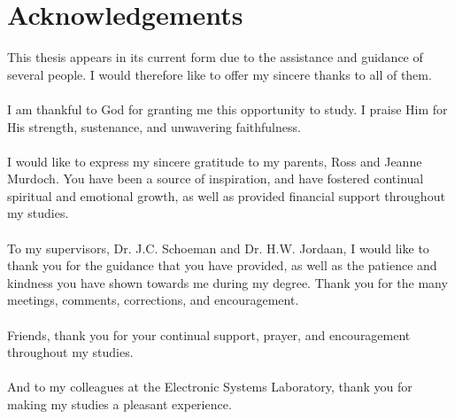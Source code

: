 \chapter{Acknowledgements}%
This thesis appears in its current form due to the assistance and guidance of several people. 
I would therefore like to offer my sincere thanks to all of them.
\\ \\
I am thankful to God for granting me this opportunity to study. I praise Him for His strength, sustenance, and unwavering faithfulness.
\\ \\
I would like to express my sincere gratitude to my parents, Ross and Jeanne Murdoch. You have been a source of inspiration, and have fostered continual spiritual and emotional growth, as well as provided financial support throughout my studies.
\\ \\
To my supervisors, Dr. J.C. Schoeman and Dr. H.W. Jordaan, I would like to thank you for the guidance that you have provided, as well as the patience and kindness you have shown towards me during my degree. Thank you for the many meetings, comments, corrections, and encouragement.
\\ \\
Friends, thank you for your continual support, prayer, and encouragement throughout my studies. 
\\ \\
And to my colleagues at the Electronic Systems Laboratory, thank you for making my studies a pleasant experience.




\endinput

